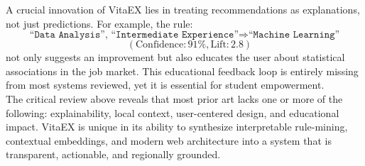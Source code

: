 \documentclass{svproc} %
\begin{document}
	A crucial innovation of VitaEX lies in treating recommendations as explanations, not just predictions. For example, the rule:
	\[
	\texttt{``Data Analysis'', ``Intermediate Experience''} \Rightarrow \texttt{``Machine Learning''}  
	\]
	\[
	\quad (\text{Confidence}: 91\%, \text{Lift}: 2.8)
	\]
	not only suggests an improvement but also educates the user about statistical associations in the job market. This educational feedback loop is entirely missing from most systems reviewed, yet it is essential for student empowerment.\\
	
	
	The critical review above reveals that most prior art lacks one or more of the following: explainability, local context, user-centered design, and educational impact. VitaEX is unique in its ability to synthesize interpretable rule-mining, contextual embeddings, and modern web architecture into a system that is transparent, actionable, and regionally grounded.
	
\end{document}
